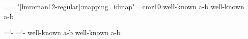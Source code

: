   
\hsize=1pt \parindent=0pt   \hfuzz=\maxdimen
\font\lm="[lmroman12-regular]:mapping=idmap"
\font\cm=cmr10
\hyphenchar{}
\hyphenchar{}
\lm well-known a-b \cm well-known a-b\par
\hyphenchar\lm=`-
\hyphenchar\cm=`-
\lm well-known a-b \cm well-known a-b\par
\bye
